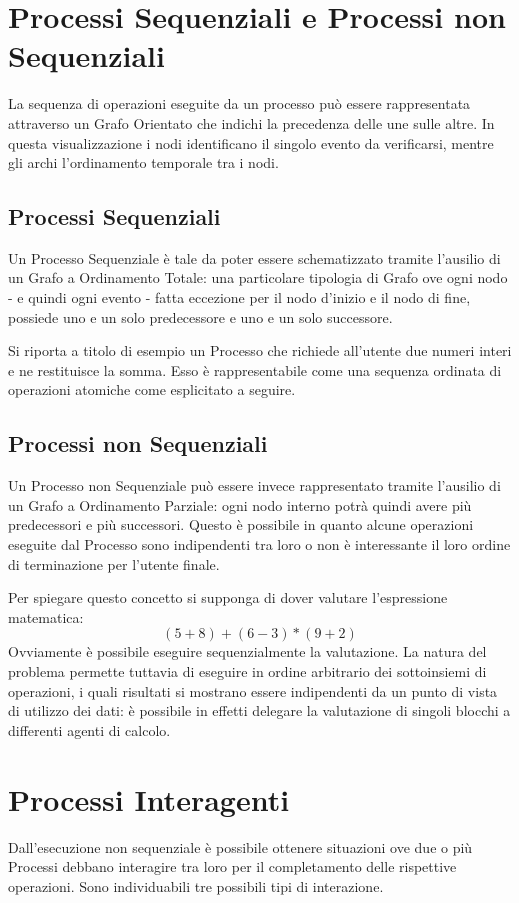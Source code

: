 \section{Processi Sequenziali e Processi non Sequenziali}
La sequenza di operazioni eseguite da un processo può essere rappresentata attraverso un Grafo Orientato che indichi la precedenza delle une sulle altre. In questa visualizzazione i nodi identificano il singolo evento da verificarsi, mentre gli archi l'ordinamento temporale tra i nodi\cite{ProcessiSeqDispense}. \par
\subsection{Processi Sequenziali}
Un Processo Sequenziale è tale da poter essere schematizzato tramite l'ausilio di un Grafo a Ordinamento Totale: una particolare tipologia di Grafo ove ogni nodo - e quindi ogni evento - fatta eccezione per il nodo d'inizio e il nodo di fine, possiede uno e un solo predecessore e uno e un solo successore. \par
Si riporta a titolo di esempio un Processo che richiede all'utente due numeri interi e ne restituisce la somma. Esso è rappresentabile come una sequenza ordinata di operazioni atomiche come esplicitato a seguire.

\subsection{Processi non Sequenziali}
Un Processo non Sequenziale può essere invece rappresentato tramite l'ausilio di un Grafo a Ordinamento Parziale: ogni nodo interno potrà quindi avere più predecessori e più successori. Questo è possibile in quanto alcune operazioni eseguite dal Processo sono indipendenti tra loro o non è interessante il loro ordine di terminazione per l'utente finale. \par
Per spiegare questo concetto si supponga di dover valutare l'espressione matematica:
$$(5 + 8) + (6 - 3) * (9 + 2)$$
Ovviamente è possibile eseguire sequenzialmente la valutazione. La natura del problema permette tuttavia di eseguire in ordine arbitrario dei sottoinsiemi di operazioni, i quali risultati si mostrano essere indipendenti da un punto di vista di utilizzo dei dati: è possibile in effetti delegare la valutazione di singoli blocchi a differenti agenti di calcolo.


\section{Processi Interagenti}
Dall'esecuzione non sequenziale è possibile ottenere situazioni ove due o più Processi debbano interagire tra loro per il completamento delle rispettive operazioni. Sono individuabili tre possibili tipi di interazione\cite{ProcessiConcorrentiDispense}.
